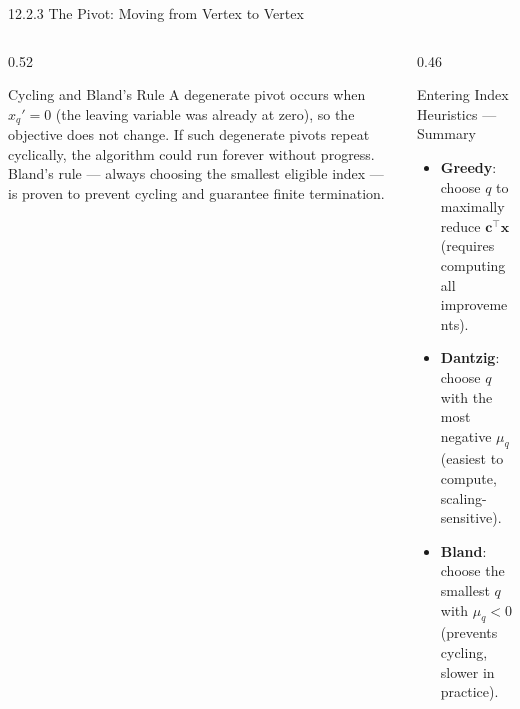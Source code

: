 \documentclass[aspectratio=169,10pt]{beamer}
\newcommand{\xv}{\mathbf{x}}
\newcommand{\cv}{\mathbf{c}}
\begin{document}
\begin{frame}[allowframebreaks]{12.2.3 The Pivot: Moving from Vertex to Vertex}
\begin{columns}
  \begin{column}{0.52\textwidth}
    \begin{alertblock}{Cycling and Bland's Rule}
      A degenerate pivot occurs when $x_q' = 0$ (the leaving variable was already
      at zero), so the objective does not change.  If such degenerate pivots repeat
      cyclically, the algorithm could run forever without progress.  Bland's rule
      --- always choosing the smallest eligible index --- is proven to prevent
      cycling and guarantee finite termination.
    \end{alertblock}
  \end{column}
  \begin{column}{0.46\textwidth}
    \begin{block}{Entering Index Heuristics --- Summary}
      \begin{itemize}
        \item \textbf{Greedy}: choose $q$ to maximally reduce
              $\cv^\top\xv$ (requires computing all improvements).
        \item \textbf{Dantzig}: choose $q$ with the most negative
              $\mu_q$ (easiest to compute, scaling-sensitive).
        \item \textbf{Bland}: choose the smallest $q$ with $\mu_q < 0$
              (prevents cycling, slower in practice).
      \end{itemize}
    \end{block}
  \end{column}
\end{columns}

\end{frame}
\end{document}
